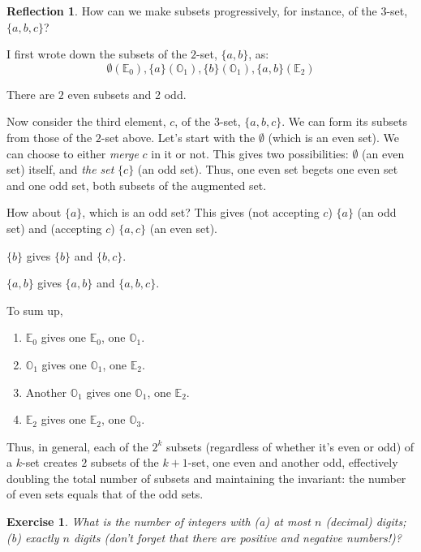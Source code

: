 \documentclass[11pt]{book}
\theoremstyle{definition}
\theoremstyle{plain}
\newtheorem{exercise}{Exercise}
\theoremstyle{definition}
\theoremstyle{problemstyle}
\theoremstyle{remark}
\theoremstyle{definition}
\newtheorem{reflection}{Reflection}
\begin{document}
\begin{reflection}

    How can we make subsets progressively, for instance, of the $3$-set, $\{a,b,c\}$?

    I first wrote down the subsets of the $2$-set, $\{a,b\}$, as: 
    \[
    \emptyset(\mathbb{E}_0),\{a\} (\mathbb{O}_1),\{b\} (\mathbb{O}_1),\{a,b\}(\mathbb{E}_2)
    \]

    There are $2$ even subsets and 2 odd. 

    Now consider the third element, $c$, of the $3$-set, $\{a,b,c\}$. We can form its subsets from those of the $2$-set above. Let's start with the $\emptyset$ (which is an even set). We can choose to either \emph{merge} $c$ in it or not. This gives two possibilities: $\emptyset$ (an even set) itself, and \emph{the set} $\{c\}$ (an odd set). Thus, one even set begets one even set and one odd set, both subsets of the augmented set.

    How about $\{a\}$, which is an odd set? This gives (not accepting $c$) $\{a\}$ (an odd set) and (accepting $c$) $\{a,c\}$ (an even set).

    $\{b\}$ gives $\{b\}$ and $\{b,c\}$.

    $\{a,b\}$ gives $\{a,b\}$ and $\{a,b,c\}$.

    To sum up,
    \begin{enumerate}
        \item $\mathbb{E}_0$ gives one $\mathbb{E}_0$, one $\mathbb{O}_1$.
        \item $\mathbb{O}_1$ gives one $\mathbb{O}_1$, one $\mathbb{E}_2$.
        \item Another $\mathbb{O}_1$ gives one $\mathbb{O}_1$, one $\mathbb{E}_2$.
        \item $\mathbb{E}_2$ gives one $\mathbb{E}_2$, one $\mathbb{O}_3$.
\end{enumerate}

    Thus, in general, each of the $2^k$ subsets (regardless of whether it's even or odd) of a $k$-set creates $2$ subsets of the $k+1$-set, one even and another odd, effectively doubling the total number of subsets and maintaining the invariant: the number of even sets equals that of the odd sets.
\end{reflection}
\begin{exercise}
    What is the number of integers with (a) at most $n$ (decimal) digits; (b) exactly $n$ digits (don't forget that there are positive and negative numbers!)?
    
    \label{ex:1.3.4}
\end{exercise}
\end{document}
